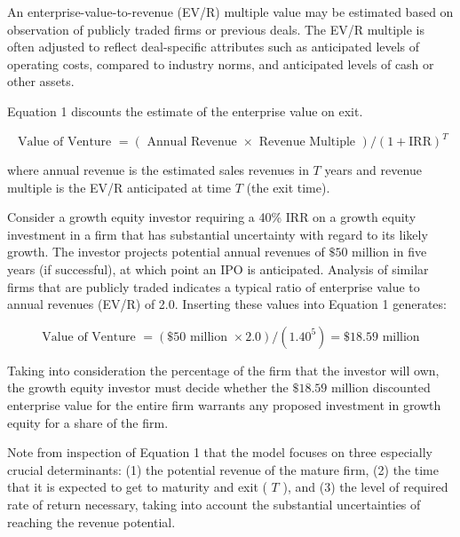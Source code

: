 \documentclass[11pt]{article}
\begin{document}
An enterprise-value-to-revenue (EV/R) multiple value may be estimated based on observation of publicly traded firms or previous deals. The EV/R multiple is often adjusted to reflect deal-specific attributes such as anticipated levels of operating costs, compared to industry norms, and anticipated levels of cash or other assets.

Equation 1 discounts the estimate of the enterprise value on exit.


\begin{equation*}
\text { Value of Venture }=(\text { Annual Revenue } \times \text { Revenue Multiple }) /(1+\mathrm{IRR})^{T} \tag{1}
\end{equation*}


where annual revenue is the estimated sales revenues in $T$ years and revenue multiple is the EV/R anticipated at time $T$ (the exit time).

Consider a growth equity investor requiring a 40\% IRR on a growth equity investment in a firm that has substantial uncertainty with regard to its likely growth. The investor projects potential annual revenues of $\$ 50$ million in five years (if successful), at which point an IPO is anticipated. Analysis of similar firms that are publicly traded indicates a typical ratio of enterprise value to annual revenues (EV/R) of 2.0. Inserting these values into Equation 1 generates:

$$
\text { Value of Venture }=(\$ 50 \text { million } \times 2.0) /\left(1.40^{5}\right)=\$ 18.59 \text { million }
$$

Taking into consideration the percentage of the firm that the investor will own, the growth equity investor must decide whether the $\$ 18.59$ million discounted enterprise value for the entire firm warrants any proposed investment in growth equity for a share of the firm.

Note from inspection of Equation 1 that the model focuses on three especially crucial determinants: (1) the potential revenue of the mature firm, (2) the time that it is expected to get to maturity and exit ( $T$ ), and (3) the level of required rate of return necessary, taking into account the substantial uncertainties of reaching the revenue potential.
\end{document}
